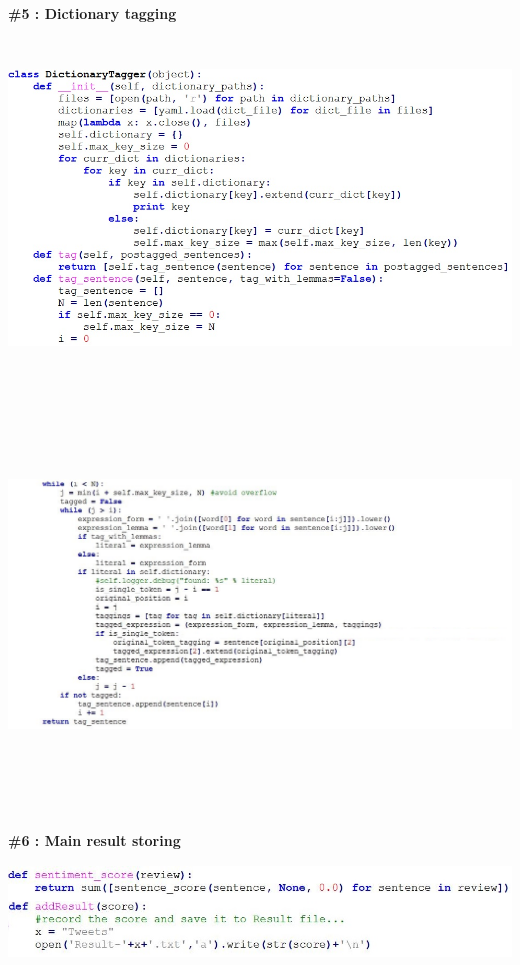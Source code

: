 \documentclass[a4paper,12pt]{report}
\begin{document}
\begin{appendices}
\begin{center}
\end{center}
\textbf{\large \#5 : Dictionary tagging }
\begin{center}
	\includegraphics[height=9cm]{images/DicTagging_1.jpg}
\end{center}
\begin{center}
	\includegraphics[height=11cm]{images/DicTagging_2.jpg}
\end{center}
\newpage
\textbf{\large \#6 : Main result storing }
\begin{center}
	\includegraphics[height=2.5cm]{images/AddResult.jpg}

\end{center}
\end{appendices}
\end{document}
